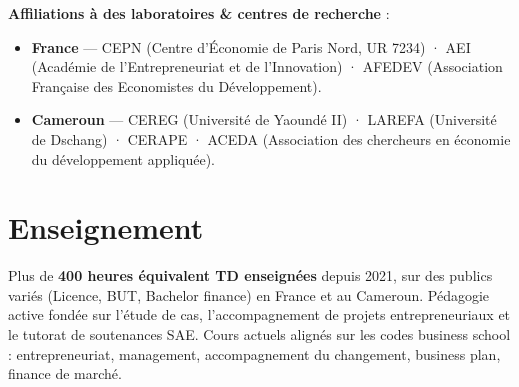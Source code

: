 \documentclass[
  french,
  10pt,
  letterpaper,
  DIV=11,
  numbers=noendperiod]{scrartcl}
\begin{document}
\textbf{Affiliations à des laboratoires \& centres de recherche} :

\begin{itemize}[itemsep=1pt]
\item \textbf{France} — CEPN (Centre d'Économie de Paris Nord, UR 7234) · AEI (Académie de l'Entrepreneuriat et de l'Innovation) · AFEDEV (Association Française des Economistes du Développement).
\item \textbf{Cameroun} — CEREG (Université de Yaoundé II) · LAREFA (Université de Dschang) · CERAPE · ACEDA (Association des chercheurs en économie du développement appliquée).
\end{itemize}

\section{Enseignement}\label{enseignement}

Plus de \textbf{400 heures équivalent TD enseignées} depuis 2021, sur
des publics variés (Licence, BUT, Bachelor finance) en France et au
Cameroun. Pédagogie active fondée sur l'étude de cas, l'accompagnement
de projets entrepreneuriaux et le tutorat de soutenances SAE. Cours
actuels alignés sur les codes business school : entrepreneuriat,
management, accompagnement du changement, business plan, finance de
marché.

\vspace{2pt}
\end{document}
